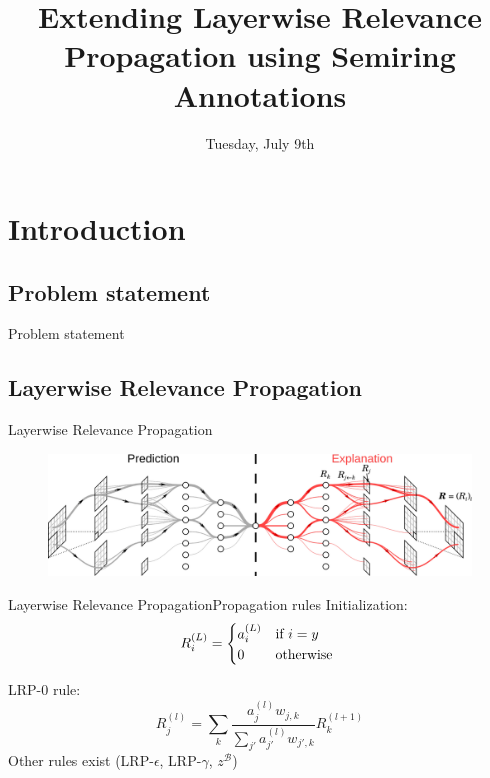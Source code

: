 \documentclass[aspectratio=169]{beamer}
\title{\textbf{Extending Layerwise Relevance Propagation using Semiring Annotations}}
\author{%
  \texorpdfstring{%
    \begin{columns}
      \column{.5\linewidth}
      \centering
      \textbf{Antoine Groudiev} \\ L3, ENS Ulm
      \column{.5\linewidth}
      \centering
      \textbf{Silviu Maniu} -- Supervisor \\ SLIDE Team, LIG
    \end{columns}
 }
 {Antoine Groudiev, Silviu Maniu}
}
\date{Tuesday, July 9th}
\theoremstyle{definition}
\begin{document}
\frame{\titlepage}


\section{Introduction}
\subsection{Problem statement}
\begin{frame}{Problem statement}

\end{frame}

\subsection{Layerwise Relevance Propagation}
\begin{frame}{Layerwise Relevance Propagation}
    \begin{figure}[H]
        \includegraphics[width=\textwidth]{LRP.png}
    \end{figure}
\end{frame}

\begin{frame}{Layerwise Relevance Propagation}{Propagation rules}
    Initialization:
    \begin{equation}
        R^{(L)}_i = \begin{cases*}
            a^{(L)}_i & if $i = y$\\
            0 & otherwise
        \end{cases*}
    \end{equation}

    LRP-0 rule:
    \begin{equation}
        R^{(l)}_j = \sum_{k}\frac{a^{(l)}_jw_{j, k}}{\sum_{j'}a^{(l)}_{j'}w_{j', k}} R^{(l+1)}_k
    \end{equation}
    \newline{}
    Other rules exist (LRP-$\epsilon$, LRP-$\gamma$, $z^\mathcal{B}$)
\end{frame}
\end{document}
